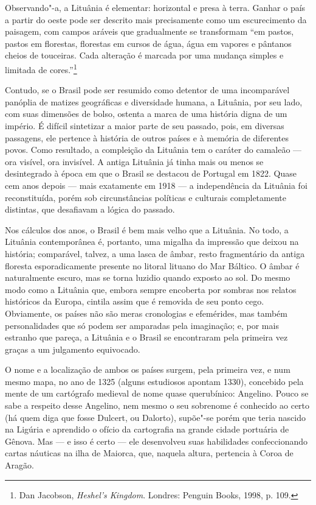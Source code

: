 Observando"-a, a Lituânia é elementar: horizontal e presa à terra.
Ganhar o país a partir do oeste pode ser descrito mais precisamente como
um escurecimento da paisagem, com campos aráveis que gradualmente se
transformam ``em pastos, pastos em florestas, florestas em cursos de
água, água em vapores e pântanos cheios de touceiras. Cada alteração é
marcada por uma mudança simples e limitada de cores.''\footnote{Dan Jacobson, \textit{Heshel's Kingdom}. Londres: Penguin Books, 1998, p. 109.}

Contudo, se o Brasil pode ser resumido como detentor de uma incomparável
panóplia de matizes geográficas e diversidade humana, a Lituânia, por
seu lado, com suas dimensões de bolso, ostenta a marca de uma história
digna de um império. É difícil sintetizar a maior parte de seu passado,
pois, em diversas passagens, ele pertence à história de outros
países e à memória de diferentes povos. Como resultado, a compleição da
Lituânia tem o caráter do camaleão --- ora visível, ora invisível. A
antiga Lituânia já tinha mais ou menos se desintegrado à época em que o
Brasil se destacou de Portugal em 1822. Quase cem anos depois --- mais
exatamente em 1918 --- a independência da Lituânia foi reconstituída,
porém sob circunstâncias políticas e culturais completamente distintas,
que desafiavam a lógica do passado. 

Nos cálculos dos anos, o Brasil é
bem mais velho que a Lituânia. No todo, a Lituânia contemporânea é,
portanto, uma migalha da impressão que deixou na história; comparável,
talvez, a uma lasca de âmbar, resto fragmentário da antiga floresta
esporadicamente presente no litoral lituano do Mar Báltico. O âmbar é
naturalmente escuro, mas se torna luzidio quando exposto ao sol. Do
mesmo modo como a Lituânia que, embora sempre encoberta por sombras nos
relatos históricos da Europa, cintila assim que é removida de seu ponto
cego. Obviamente, os países não são meras cronologias e efemérides, mas
também personalidades que só podem ser amparadas pela imaginação; e, por
mais estranho que pareça, a Lituânia e o Brasil se encontraram pela
primeira vez graças a um julgamento equivocado.

O nome e a localização de ambos os países surgem, pela primeira vez, e
num mesmo mapa, no ano de 1325 (alguns estudiosos apontam 1330),
concebido pela mente de um cartógrafo medieval de nome quase
querubínico: Angelino. Pouco se sabe a respeito desse Angelino, nem
mesmo o seu sobrenome é conhecido ao certo (há quem diga que fosse
Dulcert, ou Dalorto), supõe"-se porém que teria nascido na Ligúria e
aprendido o ofício da cartografia na grande cidade portuária de Gênova.
Mas --- e isso é certo --- ele desenvolveu suas habilidades confeccionando
cartas náuticas na ilha de Maiorca, que, naquela altura, pertencia à
Coroa de Aragão. 

